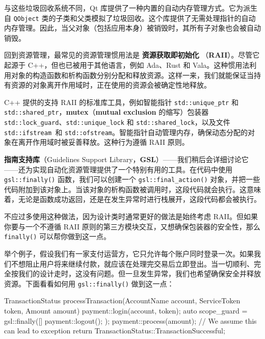 与这些垃圾回收系统不同，Qt 库提供了一种内置的自动内存管理方式。它为派生自 \texttt{QObject} 类的子类和父类模拟了垃圾回收。这个库提供了无需处理指针的自动内存管理。因此，当父对象（包括应用本身）被销毁时，其所有子对象也会被自动销毁。

\label{idx:1014}
回到资源管理，最常见的资源管理惯用法是 \textbf{资源获取即初始化 }（\textbf{RAII}）。尽管它起源于 C++，但也已被用于其他语言，例如 Ada、Rust 和 Vala。这种惯用法利用对象的构造函数和析构函数分别分配和释放资源。这样一来，我们就能保证当持有资源的对象离开作用域时，正在使用的资源会被确定性地释放。

\label{idx:1015}
C++ 提供的支持 RAII 的标准库工具，例如智能指针 \texttt{std::\allowbreak{}unique\_\allowbreak{}ptr} 和 \texttt{std::\allowbreak{}shared\_\allowbreak{}ptr}，\textbf{mutex}（\textbf{mutual exclusion} 的缩写）包装器 \texttt{std::\allowbreak{}lock\_\allowbreak{}guard}、\texttt{std::\allowbreak{}unique\_\allowbreak{}lock} 和 \texttt{std::\allowbreak{}shared\_\allowbreak{}lock}，以及文件 \texttt{std::\allowbreak{}ifstream }和 \texttt{std::\allowbreak{}ofstream}。智能指针自动管理内存，确保动态分配的对象在离开作用域时被妥善释放。这种行为遵循 RAII 原则。

\label{idx:1016}
\textbf{指南支持库}（Guidelines Support Library，\textbf{GSL}）——我们稍后会详细讨论它——还为实现自动化资源管理提供了一个特别有用的工具。在代码中使用 \texttt{gsl::\allowbreak{}finally(\allowbreak{})\allowbreak{}} 函数，我们可以创建一个 \texttt{gsl::\allowbreak{}final\_\allowbreak{}action(\allowbreak{})\allowbreak{}} 对象，并把一些代码附加到该对象上。当该对象的析构函数被调用时，这段代码就会执行。这意味着，无论是函数成功返回，还是在发生异常时进行栈展开，这段代码都会被执行。

不应过多使用这种做法，因为设计类时通常更好的做法是始终考虑 RAII。但如果你要与一个不遵循 RAII 原则的第三方模块交互，又想确保包装器的安全性，那么 \texttt{finally()} 可以帮你做到这一点。

\label{idx:1017}
举个例子，假设我们有一家支付运营方，它只允许每个账户同时登录一次。如果我们不想阻止用户将来继续付款，就应该在处理完交易后立即登出。当一切顺利、完全按我们的设计走时，这没有问题。但一旦发生异常，我们也希望确保安全并释放资源。下面看看如何用 \texttt{gsl::\allowbreak{}finally(\allowbreak{})\allowbreak{}} 做到这一点：

\begin{codebox}[text]
TransactionStatus processTransaction(AccountName account, ServiceToken token, Amount amount)
{
  payment::login(account, token);
  auto scope_guard = gsl::finally([] { payment::logout(); });
  payment::process(amount); // We assume this can lead to exception
  return TransactionStatus::TransactionSuccessful;
}
\end{codebox}

